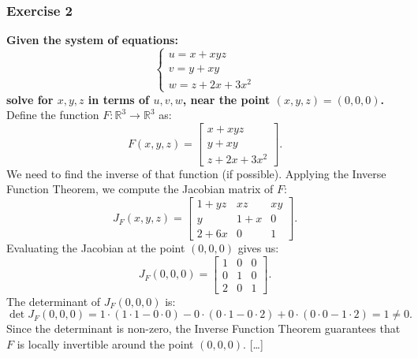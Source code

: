 \documentclass[11pt]{article}
\begin{document}
\pagebreak
\subsubsection*{Exercise 2}
\textbf{Given the system of equations:}
\[\begin{cases}
u = x + xyz \\
v = y + xy  \\
w = z + 2x + 3x^2
\end{cases}\]
\textbf{solve for \(x, y, z\) in terms of \(u, v, w\), near the point \((x, y, z) = (0, 0, 0)\).}
\vskip 0.5cm
Define the function \(F : \mathbb{R}^3 \to \mathbb{R}^3\) as:
\[F(x, y, z) = \begin{bmatrix} x + xyz \\ y + xy \\ z + 2x + 3x^2 \end{bmatrix}.\]
We need to find the inverse of that function (if possible).
Applying the Inverse Function Theorem, we compute the Jacobian matrix of \(F\):
\[J_F(x, y, z) = \begin{bmatrix} 1 + yz & xz & xy \\ y & 1 + x & 0 \\ 2 + 6x & 0 & 1 \end{bmatrix}.\]
Evaluating the Jacobian at the point \((0, 0, 0)\) gives us:
\[J_F(0, 0, 0) = \begin{bmatrix} 1 & 0 & 0 \\ 0 & 1 & 0 \\ 2 & 0 & 1 \end{bmatrix}.\]
The determinant of \(J_F(0, 0, 0)\) is:
\[\det J_F(0, 0, 0) = 1 \cdot (1 \cdot 1 - 0 \cdot 0) - 0 \cdot (0 \cdot 1 - 0 \cdot 2) + 0 \cdot (0 \cdot 0 - 1 \cdot 2) = 1 \neq 0.\]
Since the determinant is non-zero, the Inverse Function Theorem guarantees that \(F\) is locally invertible around the point \((0, 0, 0)\). [\dots]
\pagebreak
\end{document}
